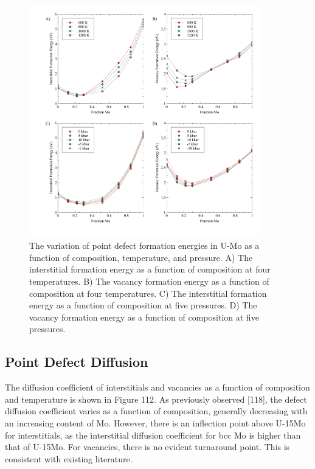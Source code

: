 \documentclass[11pt, oneside]{elsarticle}
\begin{document}
\begin{figure}[htbp]
\begin{center}
\includegraphics[width=0.9\textwidth]{figA.pdf} 
\caption{The variation of point defect formation energies in U-Mo as a function of composition, temperature, and pressure. A) The interstitial formation energy as a function of composition at four temperatures. B) The vacancy formation energy as a function of composition at four temperatures. C) The interstitial formation energy as a function of composition at five pressures. D) The vacancy formation energy as a function of composition at five pressures. }
\label{fig:A}
\end{center}
\end{figure}

\subsection{Point Defect Diffusion}
The diffusion coefficient of interstitials and vacancies as a function of composition and temperature is shown in Figure 112. As previously observed [118], the defect diffusion coefficient varies as a function of composition, generally decreasing with an increasing content of Mo. However, there is an inflection point above U-15Mo for interstitials, as the interstitial diffusion coefficient for bcc Mo is higher than that of U-15Mo. For vacancies, there is no evident turnaround point. This is consistent with existing literature. 
\end{document}
